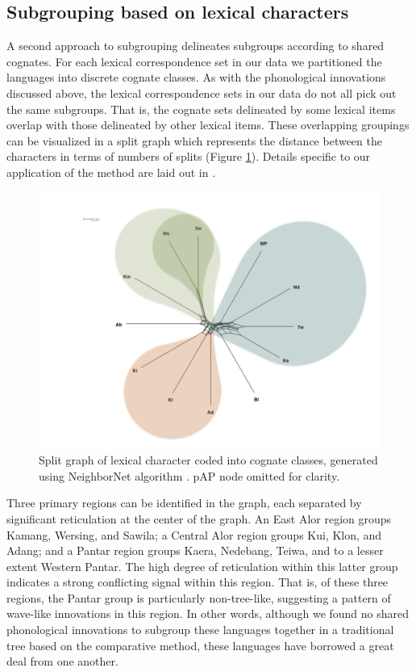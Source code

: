 \subsection{ Subgrouping based on lexical characters}
A second approach to subgrouping delineates subgroups according to shared cognates. For each lexical correspondence set in our data we partitioned the languages into discrete cognate classes. As with the phonological innovations discussed above, the lexical correspondence sets in our data do not all pick out the same subgroups. That is, the cognate sets delineated by some lexical items overlap with those delineated by other lexical items. These overlapping groupings can be visualized in a split graph which represents the distance between the characters in terms of numbers of splits (Figure \ref{fig:2:split_graph}). Details specific to our application of the method are laid out in \citet{RobinsonEtAl2012internal}.

\begin{figure}\centering
\includegraphics[width=\textwidth]{figures/Ch2HoltonRobinsonAPhistoryMKprooftmp-img3.jpg}
\caption{Split graph of lexical character coded into cognate classes, generated using NeighborNet algorithm  \citep{HusonEtAl2006}. pAP node omitted for clarity.}
\label{fig:2:split_graph}
\end{figure}

Three primary regions can be identified in the graph, each separated by significant reticulation at the center of the graph. An East Alor region groups Kamang, Wersing, and Sawila; a Central Alor region groups Kui, Klon, and Adang; and a Pantar region groups Kaera, Nedebang, Teiwa, and to a lesser extent Western Pantar. The high degree of reticulation within this latter group indicates a strong conflicting signal within this region. That is, of these three regions, the Pantar group is particularly non-tree-like, suggesting a pattern of wave-like innovations in this region. In other words, although we found no shared phonological innovations to subgroup these languages together in a traditional tree based on the comparative method, these languages have borrowed a great deal from one another. 

